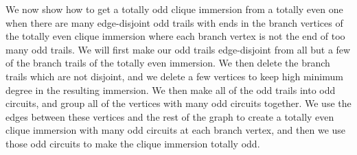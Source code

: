 \documentclass{article}
\theoremstyle{definition}
\begin{document}
We now show how to get a totally odd clique immersion from a totally even one when there are many edge-disjoint odd trails with ends in the branch vertices of the totally even clique immersion where each branch vertex is not the end of too many odd trails. We will first make our odd trails edge-disjoint from all but a few of the branch trails of the totally even immersion. We then delete the branch trails which are not disjoint, and we delete a few vertices to keep high minimum degree in the resulting immersion. We then make all of the odd trails into odd circuits, and group all of the vertices with many odd circuits together. We use the edges between these vertices and the rest of the graph to create a totally even clique immersion with many odd circuits at each branch vertex, and then we use those odd circuits to make the clique immersion totally odd. 
\end{document}

